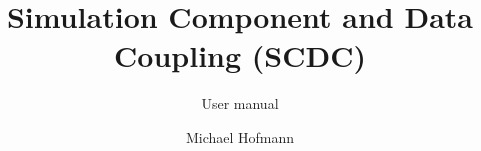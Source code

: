 \documentclass[
11pt,
a4paper,
parskip=true,
]{scrreprt}
\begin{document}
\title{Simulation Component and Data Coupling (SCDC)}
\subtitle{User manual}

\author{Michael Hofmann}

\maketitle

\setcounter{tocdepth}{1}
\tableofcontents









\end{document}
